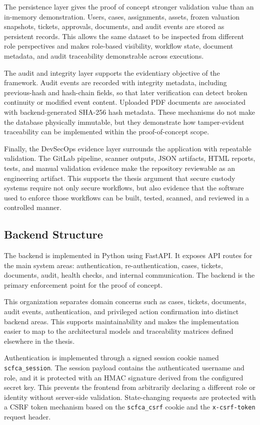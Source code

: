 \documentclass[12pt,a4paper]{report}
\begin{document}
The persistence layer gives the proof of concept stronger validation value than an in-memory demonstration. Users, cases, assignments, assets, frozen valuation snapshots, tickets, approvals, documents, and audit events are stored as persistent records. This allows the same dataset to be inspected from different role perspectives and makes role-based visibility, workflow state, document metadata, and audit traceability demonstrable across executions.

The audit and integrity layer supports the evidentiary objective of the framework. Audit events are recorded with integrity metadata, including previous-hash and hash-chain fields, so that later verification can detect broken continuity or modified event content. Uploaded PDF documents are associated with backend-generated SHA-256 hash metadata. These mechanisms do not make the database physically immutable, but they demonstrate how tamper-evident traceability can be implemented within the proof-of-concept scope.

Finally, the DevSecOps evidence layer surrounds the application with repeatable validation. The GitLab pipeline, scanner outputs, JSON artifacts, HTML reports, tests, and manual validation evidence make the repository reviewable as an engineering artifact. This supports the thesis argument that secure custody systems require not only secure workflows, but also evidence that the software used to enforce those workflows can be built, tested, scanned, and reviewed in a controlled manner.

\subsection{Backend Structure}

The backend is implemented in Python using FastAPI. It exposes API routes for the main system areas: authentication, re-authentication, cases, tickets, documents, audit, health checks, and internal communication. The backend is the primary enforcement point for the proof of concept.

This organization separates domain concerns such as cases, tickets, documents, audit events, authentication, and privileged action confirmation into distinct backend areas. This supports maintainability and makes the implementation easier to map to the architectural models and traceability matrices defined elsewhere in the thesis.

Authentication is implemented through a signed session cookie named \texttt{scfca\_session}. The session payload contains the authenticated username and role, and it is protected with an HMAC signature derived from the configured secret key. This prevents the frontend from arbitrarily declaring a different role or identity without server-side validation. State-changing requests are protected with a CSRF token mechanism based on the \texttt{scfca\_csrf} cookie and the \texttt{x-csrf-token} request header.
\end{document}
